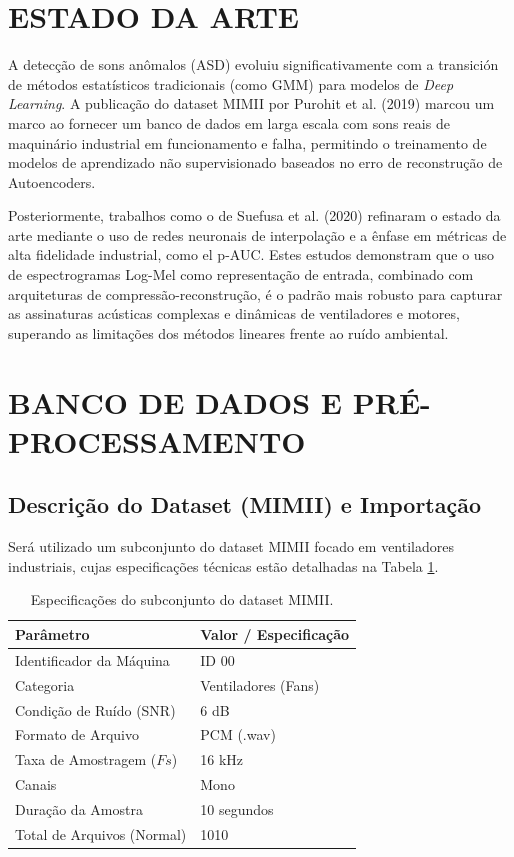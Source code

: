 \documentclass{article}
\begin{document}
\section{ESTADO DA ARTE}
\label{sec:state}

A detecção de sons anômalos (ASD) evoluiu significativamente com a transición de métodos estatísticos tradicionais (como GMM) para modelos de \textit{Deep Learning}. A publicação do dataset MIMII por Purohit et al. (2019) marcou um marco ao fornecer um banco de dados em larga escala com sons reais de maquinário industrial em funcionamento e falha, permitindo o treinamento de modelos de aprendizado não supervisionado baseados no erro de reconstrução de Autoencoders.

Posteriormente, trabalhos como o de Suefusa et al. (2020) refinaram o estado da arte mediante o uso de redes neuronais de interpolação e a ênfase em métricas de alta fidelidade industrial, como el p-AUC. Estes estudos demonstram que o uso de espectrogramas Log-Mel como representação de entrada, combinado com arquiteturas de compressão-reconstrução, é o padrão mais robusto para capturar as assinaturas acústicas complexas e dinâmicas de ventiladores e motores, superando as limitações dos métodos lineares frente ao ruído ambiental.

\section{BANCO DE DADOS E PRÉ-PROCESSAMENTO}
\label{sec:data}

\subsection{Descrição do Dataset (MIMII) e Importação}
\label{ssec:dataset}

Será utilizado um subconjunto do dataset MIMII focado em ventiladores industriais, cujas especificações técnicas estão detalhadas na Tabela \ref{tab:dataset}.

\begin{table}[htb]
\centering
\caption{Especificações do subconjunto do dataset MIMII.}
\label{tab:dataset}
\begin{tabular}{|l|l|}
\hline
\textbf{Parâmetro} & \textbf{Valor / Especificação} \\ \hline
Identificador da Máquina & ID 00 \\ \hline
Categoria & Ventiladores (Fans) \\ \hline
Condição de Ruído (SNR) & 6 dB \\ \hline
Formato de Arquivo & PCM (.wav) \\ \hline
Taxa de Amostragem ($Fs$) & 16 kHz \\ \hline
Canais & Mono \\ \hline
Duração da Amostra & 10 segundos \\ \hline
Total de Arquivos (Normal) & 1010 \\ \hline
\end{tabular}
\end{table}
\end{document}
